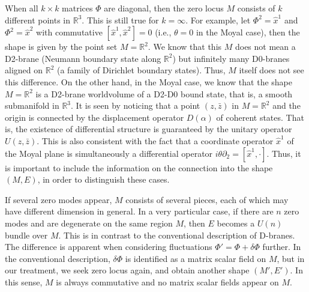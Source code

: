 \documentclass[12pt]{article}
\numberwithin{equation}{section}
\def\real{\mathbb{R}}
\begin{document}
When all $k\times k$ matrices $\Phi$ are diagonal, then the zero locus $M$
consists of $k$ different points in $\real^3$.
This is still true for $k=\infty$.
For example, let $\Phi^2=\hat{x}^1$ and $\Phi^2 =\hat{x}^2$ with commutative 
$[\hat{x}^1,\hat{x}^2]=0$ (i.e., $\theta=0$ in the Moyal case), then the shape
is given by the point set $M=\real^2$.
We know that this $M$ does not mean a D2-brane (Neumann boundary state along $\real^2$)
but infinitely many D0-branes aligned on $\real^2$ (a family of Dirichlet boundary states). 
Thus, $M$ itself does not see this difference.
On the other hand, in the Moyal case, we know that 
the shape $M=\real^2$ is a D2-brane worldvolume of a D2-D0 bound state, 
that is, a smooth submanifold in $\real^3$.
It is seen by noticing that a point $(z,\bar{z})$ in $M=\real^2$ and the origin is 
connected by the displacement operator $D(\alpha)$ of coherent states.
That is, the existence of differential structure is guaranteed by the unitary operator $U(z,\bar{z})$.
This is also consistent with the fact that a coordinate operator $\hat{x}^1$ of the Moyal 
plane is simultaneously a differential operator $i\theta \partial_2=[\hat{x}^1,\cdot]$.
Thus, it is important to include the information on the connection into the shape $(M,E)$,
in order to distinguish these cases.

If several zero modes appear, $M$ consists of several pieces, 
each of which may have different dimension in general.
In a very particular case, if there are $n$ zero modes and are degenerate on the same region $M$, then $E$ becomes a $U(n)$ bundle over $M$.
This is in contrast to the conventional description of D-branes.
The difference is apparent when considering fluctuations $\Phi'=\Phi +\delta \Phi$ further.
In the conventional description, $\delta \Phi$ is identified as a matrix scalar field on $M$,
but in our treatment, we seek zero locus again, and obtain another shape $(M',E')$.
In this sense, $M$ is always commutative and no matrix scalar fields appear on $M$.
\end{document}
